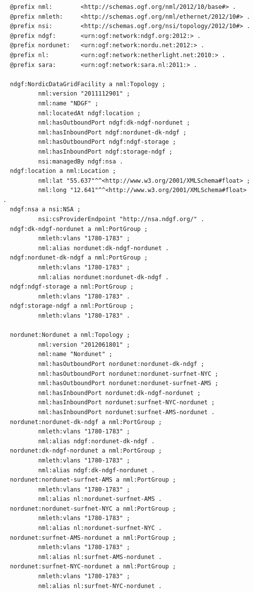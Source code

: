 \documentclass{article}
\begin{document}
\begin{verbatim}
  @prefix nml:        <http://schemas.ogf.org/nml/2012/10/base#> .
  @prefix nmleth:     <http://schemas.ogf.org/nml/ethernet/2012/10#> .
  @prefix nsi:        <http://schemas.ogf.org/nsi/topology/2012/10#> .
  @prefix ndgf:       <urn:ogf:network:ndgf.org:2012:> .
  @prefix nordunet:   <urn:ogf:network:nordu.net:2012:> .
  @prefix nl:         <urn:ogf:network:netherlight.net:2010:> .
  @prefix sara:       <urn:ogf:network:sara.nl:2011:> .

  ndgf:NordicDataGridFacility a nml:Topology ;
          nml:version "2011112901" ;
          nml:name "NDGF" ;
          nml:locatedAt ndgf:location ;
          nml:hasOutboundPort ndgf:dk-ndgf-nordunet ;
          nml:hasInboundPort ndgf:nordunet-dk-ndgf ;
          nml:hasOutboundPort ndgf:ndgf-storage ;
          nml:hasInboundPort ndgf:storage-ndgf ;
          nsi:managedBy ndgf:nsa .
  ndgf:location a nml:Location ;
          nml:lat "55.637"^^<http://www.w3.org/2001/XMLSchema#float> ;
          nml:long "12.641"^^<http://www.w3.org/2001/XMLSchema#float> .
  ndgf:nsa a nsi:NSA ;
          nsi:csProviderEndpoint "http://nsa.ndgf.org/" .
  ndgf:dk-ndgf-nordunet a nml:PortGroup ;
          nmleth:vlans "1780-1783" ;
          nml:alias nordunet:dk-ndgf-nordunet .
  ndgf:nordunet-dk-ndgf a nml:PortGroup ;
          nmleth:vlans "1780-1783" ;
          nml:alias nordunet:nordunet-dk-ndgf .
  ndgf:ndgf-storage a nml:PortGroup ;
          nmleth:vlans "1780-1783" .
  ndgf:storage-ndgf a nml:PortGroup ;
          nmleth:vlans "1780-1783" .

  nordunet:Nordunet a nml:Topology ;
          nml:version "2012061801" ;
          nml:name "Nordunet" ;
          nml:hasOutboundPort nordunet:nordunet-dk-ndgf ;
          nml:hasOutboundPort nordunet:nordunet-surfnet-NYC ;
          nml:hasOutboundPort nordunet:nordunet-surfnet-AMS ;
          nml:hasInboundPort nordunet:dk-ndgf-nordunet ;
          nml:hasInboundPort nordunet:surfnet-NYC-nordunet ;
          nml:hasInboundPort nordunet:surfnet-AMS-nordunet .
  nordunet:nordunet-dk-ndgf a nml:PortGroup ;
          nmleth:vlans "1780-1783" ;
          nml:alias ndgf:nordunet-dk-ndgf .
  nordunet:dk-ndgf-nordunet a nml:PortGroup ;
          nmleth:vlans "1780-1783" ;
          nml:alias ndgf:dk-ndgf-nordunet .
  nordunet:nordunet-surfnet-AMS a nml:PortGroup ;
          nmleth:vlans "1780-1783" ;
          nml:alias nl:nordunet-surfnet-AMS .
  nordunet:nordunet-surfnet-NYC a nml:PortGroup ;
          nmleth:vlans "1780-1783" ;
          nml:alias nl:nordunet-surfnet-NYC .
  nordunet:surfnet-AMS-nordunet a nml:PortGroup ;
          nmleth:vlans "1780-1783" ;
          nml:alias nl:surfnet-AMS-nordunet .
  nordunet:surfnet-NYC-nordunet a nml:PortGroup ;
          nmleth:vlans "1780-1783" ;
          nml:alias nl:surfnet-NYC-nordunet .


\end{verbatim}
\end{document}
